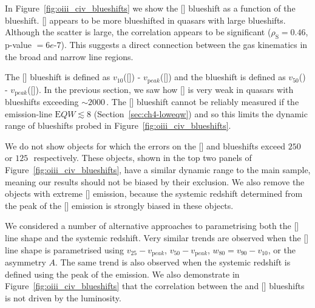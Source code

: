 In Figure~\ref{fig:oiii_civ_blueshifts} we show the [] blueshift as a function of the  blueshift.
[] appears to be more blueshifted in quasars with large  blueshifts.
Although the scatter is large, the correlation appears to be significant ($\rho_{\mathrm S}=0.46$, p-value $=6e\text{-}7$). 
This suggests a direct connection between the gas kinematics in the broad and narrow line regions. 

The [] blueshift is defined as $v_{10}$([]) - $v_{\mathrm peak}$([]) and the  blueshift is defined as $v_{50}$() - $v_{\mathrm peak}$([]).
In the previous section, we saw how [] is very weak in quasars with  blueshifts exceeding $\sim2000$\,\kms. 
The [] blueshift cannot be reliably measured if the emission-line ${\mathrm EQW} \lesssim 8$ (Section~\ref{sec:ch4-loweqw}) and so this limits the dynamic range of  blueshifts probed in Figure~\ref{fig:oiii_civ_blueshifts}. 

We do not show objects for which the errors on the [] and  blueshifts exceed $250$ or $125$\,\kms\, respectively. 
These objects, shown in the top two panels of Figure~\ref{fig:oiii_civ_blueshifts}, have a similar dynamic range to the main sample, meaning our results should not be biased by their exclusion.  
We also remove the objects with extreme [] emission, because the systemic redshift determined from the peak of the [] emission is strongly biased in these objects. 

We considered a number of alternative approaches to parametrising both the [] line shape and the systemic redshift. 
Very similar trends are observed when the [] line shape is parametrised using $v_{25} - v_{\mathrm peak}$, $v_{50} - v_{\mathrm peak}$, $w_{80} = v_{90} - v_{10}$, or the asymmetry $A$.
The same trend is also observed when the systemic redshift is defined using the peak of the \hb emission. 
We also demonstrate in Figure~\ref{fig:oiii_civ_blueshifts} that the correlation between the  and [] blueshifts is not driven by the luminosity. 

